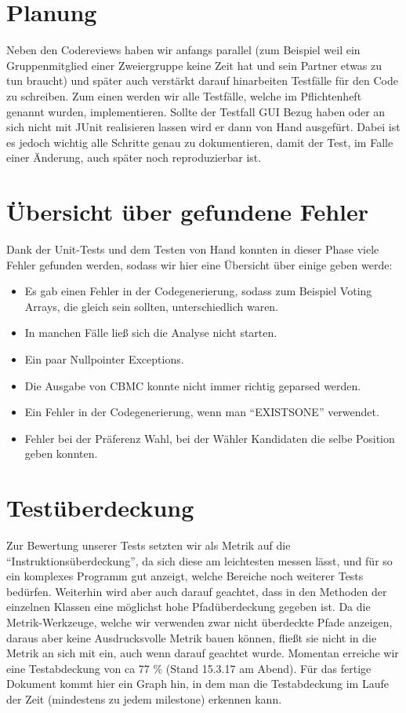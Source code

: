 ﻿\documentclass[a4paper]{scrreprt}
\begin{document}
\section{Planung}
Neben den Codereviews haben wir anfangs parallel (zum
Beispiel weil ein Gruppenmitglied einer Zweiergruppe keine Zeit hat und sein
Partner etwas zu tun braucht) und später auch
verstärkt darauf hinarbeiten Testfälle für den Code zu schreiben.
Zum einen werden wir alle Testfälle, welche im Pflichtenheft genannt wurden,
implementieren. Sollte der Testfall GUI Bezug haben oder an sich nicht mit JUnit
realisieren lassen wird er dann von Hand ausgefürt. Dabei ist es jedoch wichtig alle Schritte genau zu
dokumentieren, damit der Test, im Falle einer Änderung, auch später noch
reproduzierbar ist.

\section{Übersicht über gefundene Fehler}
Dank der Unit-Tests und dem Testen von Hand konnten in dieser Phase  viele
Fehler gefunden werden, sodass wir hier eine Übersicht über einige geben werde:

\begin{itemize}
  \item Es gab einen Fehler in der Codegenerierung, sodass zum Beispiel Voting
  Arrays, die gleich sein sollten, unterschiedlich waren.
  \item In manchen Fälle ließ sich die Analyse nicht starten.
  \item Ein paar Nullpointer Exceptions.
  \item Die Ausgabe von CBMC konnte nicht immer richtig geparsed werden.
  \item Ein Fehler in der Codegenerierung, wenn man "`EXISTSONE"' verwendet.
  \item Fehler bei der Präferenz Wahl, bei der Wähler Kandidaten die selbe
  Position geben konnten.
\end{itemize}


\section{Testüberdeckung}
Zur Bewertung unserer Tests setzten wir als Metrik auf die
"`Instruktionsüberdeckung"', da sich diese am leichtesten messen lässt, und für
so ein komplexes Programm gut anzeigt, welche Bereiche noch weiterer Tests
bedürfen.
Weiterhin wird aber auch darauf geachtet, dass in den Methoden der einzelnen Klassen eine möglichst hohe
Pfadüberdeckung gegeben ist. Da die Metrik-Werkzeuge, welche wir verwenden zwar
nicht überdeckte Pfade anzeigen, daraus aber keine Ausdrucksvolle Metrik bauen
können, fließt sie nicht in die Metrik an sich mit ein, auch wenn darauf
geachtet wurde.
\newline
Momentan erreiche wir eine Testabdeckung von ca 77 \% (Stand 15.3.17 am Abend).
Für das fertige Dokument kommt hier ein Graph hin, in dem man die Testabdeckung
im Laufe der Zeit (mindestens zu jedem milestone) erkennen kann.
\end{document}
